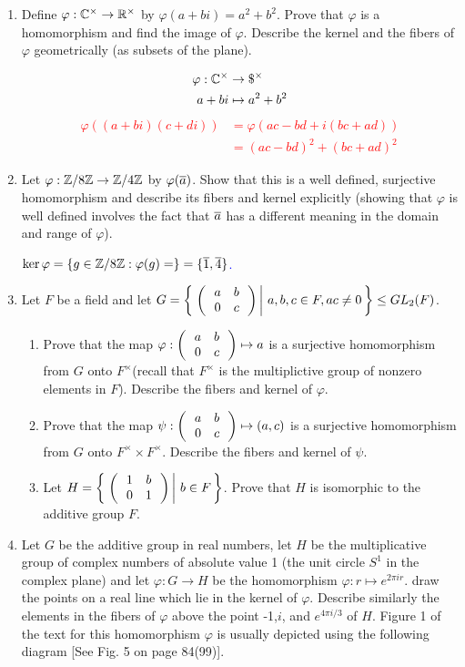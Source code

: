 \documentclass[10pt,a4paper]{report}
\newcommand{\RED}[1]{\textcolor{red}{#1}}
\newcommand{\BLUE}[1]{\textcolor{blue}{#1}}
\begin{document}
\begin{enumerate}
	\item Define $\varphi:\mathbb{C}^\times \to\mathbb{R}^\times$ by $\varphi(a+bi)=a^2+b^2$.  Prove that $\varphi$ is a homomorphism and find the image of $\varphi$.  Describe the kernel and the fibers of $\varphi$ geometrically (as subsets of the plane).
	
	\RED{\begin{align*}
		\varphi: \mathbb{C}^\times &\to \$^\times \\
		a+bi &\mapsto a^2+b^2
	\end{align*}
	\begin{align*}
		\varphi((a+bi)(c+di)) &= \varphi(ac-bd +i(bc+ad)) \\	
			&= (ac-bd)^2+(bc+ad)^2 
	\end{align*}
	}
	
	\item Let $\varphi: \mathbb{Z}/8\mathbb{Z} \to \mathbb{Z}/4\mathbb{Z}$ by $\varphi(\overline{a})$.  Show that this is a well defined, surjective homomorphism and describe its fibers and kernel explicitly (showing that $\varphi$ is well defined involves the fact that $\overline{a}$ has a different meaning in the domain and range of $\varphi$).
	
	\BLUE{$\ker \varphi = \{ g \in \mathbb{Z}/8\mathbb{Z} : \varphi(g) = \} = \{ \overline{1}, \overline{4}\}$.
	}
	
	\item Let $F$ be a  field and let $G = \left \{\, \left . \left (\,  \begin{array}{c c} a&b \\ 0 & c \end{array}  \,\right ) \, \right |\, a,b,c \in F, ac \ne 0 \,\right \} \le GL_2(F)$.
	\begin{enumerate}
		\item Prove that the map $\varphi: \left (\,  \begin{array}{c c} a&b \\ 0 & c \end{array}  \,\right ) \mapsto a$ is a surjective homomorphism from $G$ onto $F^\times$(recall that $F^\times$ is the multiplictive group of nonzero elements in $F$).  Describe the fibers and kernel of $\varphi$.
		
		\item Prove that the map $\psi:\left (\,  \begin{array}{c c} a&b \\ 0 & c \end{array}  \,\right )\mapsto (a,c)$ is a surjective homomorphism from $G$ onto $F^\times \times F^\times$.  Describe the fibers and kernel of $\psi$.
		
		\item Let $H = \left \{\, \left . \left (\,  \begin{array}{c c} 1&b \\ 0 & 1 \end{array}  \,\right ) \, \right |\, b \in F \,\right \}$.  Prove that $H$ is isomorphic to the additive group $F$.
	\end{enumerate}
	
	\item Let $G$ be the additive group in real numbers, let $H$ be the multiplicative group of complex numbers of absolute value 1 (the unit circle $S^1$ in the complex plane) and let $\varphi : G \to H$ be the homomorphism $\varphi: r \mapsto e^{2\pi ir}$.  draw the points on a real line which lie in the kernel of $\varphi$.  Describe similarly the elements in the fibers of $\varphi$ above the point -1,$i$, and $e^{4\pi i/3}$ of $H$. Figure 1 of the text for this homomorphism $\varphi$ is usually depicted using the following diagram [See Fig. 5 on page 84(99)].
	

\end{enumerate}
\end{document}

